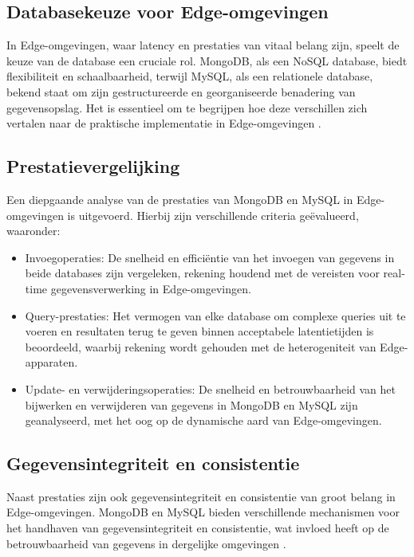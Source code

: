 \subsection{Databasekeuze voor Edge-omgevingen}

In Edge-omgevingen, waar latency en prestaties van vitaal belang zijn, speelt de keuze van de database een cruciale rol. MongoDB, als een NoSQL database, biedt flexibiliteit en schaalbaarheid, terwijl MySQL, als een relationele database, bekend staat om zijn gestructureerde en georganiseerde benadering van gegevensopslag. Het is essentieel om te begrijpen hoe deze verschillen zich vertalen naar de praktische implementatie in Edge-omgevingen \autocite{Gyorodi2015comparative}.

\subsection{Prestatievergelijking}

Een diepgaande analyse van de prestaties van MongoDB en MySQL in Edge-omgevingen is uitgevoerd. Hierbij zijn verschillende criteria geëvalueerd, waaronder:

\begin{itemize}
    \item Invoegoperaties: De snelheid en efficiëntie van het invoegen van gegevens in beide databases zijn vergeleken, rekening houdend met de vereisten voor real-time gegevensverwerking in Edge-omgevingen.
    \item Query-prestaties: Het vermogen van elke database om complexe queries uit te voeren en resultaten terug te geven binnen acceptabele latentietijden is beoordeeld, waarbij rekening wordt gehouden met de heterogeniteit van Edge-apparaten.
    \item Update- en verwijderingsoperaties: De snelheid en betrouwbaarheid van het bijwerken en verwijderen van gegevens in MongoDB en MySQL zijn geanalyseerd, met het oog op de dynamische aard van Edge-omgevingen.
\end{itemize}

\subsection{Gegevensintegriteit en consistentie}

Naast prestaties zijn ook gegevensintegriteit en consistentie van groot belang in Edge-omgevingen. MongoDB en MySQL bieden verschillende mechanismen voor het handhaven van gegevensintegriteit en consistentie, wat invloed heeft op de betrouwbaarheid van gegevens in dergelijke omgevingen \autocite{Gyorodi2015comparative}.

